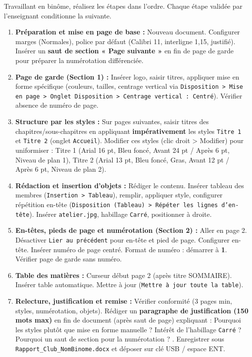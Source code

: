 \documentclass[11pt]{article}
\begin{document}
\begin{methode}
Travaillant en binôme, réalisez les étapes dans l'ordre. Chaque étape validée par l'enseignant conditionne la suivante.
\begin{enumerate}
    \item \textbf{Préparation et mise en page de base :} Nouveau document. Configurer marges (Normales), police par défaut (Calibri 11, interligne 1,15, justifié). Insérer un \textbf{saut de section « Page suivante »} en fin de page de garde pour préparer la numérotation différenciée.
    \item \textbf{Page de garde (Section 1) :} Insérer logo, saisir titres, appliquer mise en forme spécifique (couleurs, tailles, centrage vertical via \texttt{Disposition > Mise en page > Onglet Disposition > Centrage vertical : Centré}). Vérifier absence de numéro de page.
    \item \textbf{Structure par les styles :} Sur pages suivantes, saisir titres des chapitres/sous-chapitres en appliquant \textbf{impérativement} les styles \texttt{Titre 1} et \texttt{Titre 2} (onglet \texttt{Accueil}). Modifier ces styles (clic droit > Modifier) pour uniformiser : Titre 1 (Arial 16 pt, Bleu foncé, Avant 24 pt / Après 6 pt, Niveau de plan 1), Titre 2 (Arial 13 pt, Bleu foncé, Gras, Avant 12 pt / Après 6 pt, Niveau de plan 2).
    \item \textbf{Rédaction et insertion d'objets :} Rédiger le contenu. Insérer tableau des membres (\texttt{Insertion > Tableau}), remplir, appliquer style, configurer répétition en-tête (\texttt{Disposition (Tableau) > Répéter les lignes d'en-tête}). Insérer \texttt{atelier.jpg}, habillage \texttt{Carré}, positionner à droite.
    \item \textbf{En-têtes, pieds de page et numérotation (Section 2) :} Aller en page 2. Désactiver \texttt{Lier au précédent} pour en-tête et pied de page. Configurer en-tête. Insérer numéro de page centré. Format de numéro : démarrer à \textbf{1}. Vérifier page de garde sans numéro.
    \item \textbf{Table des matières :} Curseur début page 2 (après titre SOMMAIRE). Insérer table automatique. Mettre à jour (\texttt{Mettre à jour toute la table}).
    \item \textbf{Relecture, justification et remise :} Vérifier conformité (3 pages min, styles, numérotation, objets). Rédiger un \textbf{paragraphe de justification (150 mots max)} en fin de document (après saut de page) expliquant : \og Pourquoi les styles plutôt que mise en forme manuelle ? Intérêt de l'habillage \texttt{Carré} ? Pourquoi un saut de section pour la numérotation ? \fg. Enregistrer sous \texttt{Rapport\_Club\_NomBinome.docx} et déposer sur clé USB / espace ENT.
\end{enumerate}
\end{methode}
\end{document}

